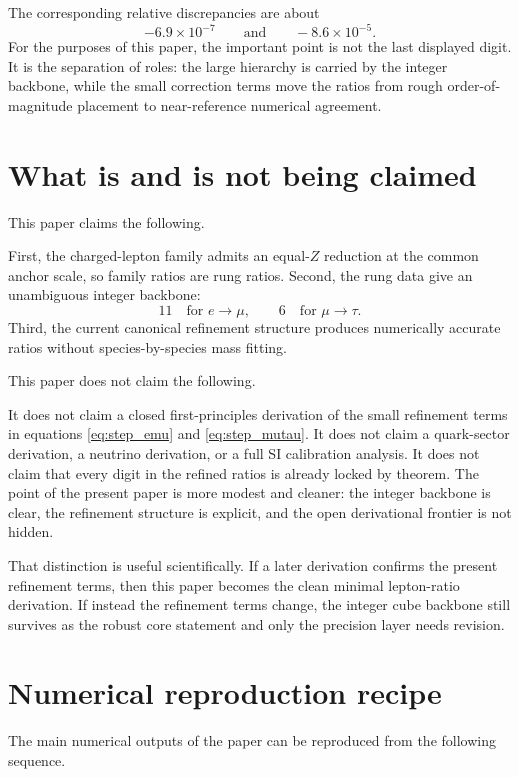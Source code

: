 \documentclass[11pt]{article}
\begin{document}
The corresponding relative discrepancies are about
\[
-6.9\times10^{-7}
\qquad\text{and}\qquad
-8.6\times10^{-5}.
\]
For the purposes of this paper, the important point is not the last displayed digit. It is the separation of roles: the large hierarchy is carried by the integer backbone, while the small correction terms move the ratios from rough order-of-magnitude placement to near-reference numerical agreement.

\section{What is and is not being claimed}

This paper claims the following.

First, the charged-lepton family admits an equal-\(Z\) reduction at the common anchor scale, so family ratios are rung ratios. Second, the rung data give an unambiguous integer backbone:
\[
11\quad\text{for }e\to\mu,
\qquad
6\quad\text{for }\mu\to\tau.
\]
Third, the current canonical refinement structure produces numerically accurate ratios without species-by-species mass fitting.

This paper does not claim the following.

It does not claim a closed first-principles derivation of the small refinement terms in equations \eqref{eq:step_emu} and \eqref{eq:step_mutau}. It does not claim a quark-sector derivation, a neutrino derivation, or a full SI calibration analysis. It does not claim that every digit in the refined ratios is already locked by theorem. The point of the present paper is more modest and cleaner: the integer backbone is clear, the refinement structure is explicit, and the open derivational frontier is not hidden.

That distinction is useful scientifically. If a later derivation confirms the present refinement terms, then this paper becomes the clean minimal lepton-ratio derivation. If instead the refinement terms change, the integer cube backbone still survives as the robust core statement and only the precision layer needs revision.

\appendix

\section{Numerical reproduction recipe}

The main numerical outputs of the paper can be reproduced from the following sequence.
\end{document}
